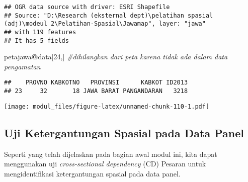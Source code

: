 \documentclass[
]{book}
\newenvironment{Shaded}{\begin{snugshade}}{\end{snugshade}}
\newcommand{\CommentTok}[1]{\textcolor[rgb]{0.56,0.35,0.01}{\textit{#1}}}
\newcommand{\DataTypeTok}[1]{\textcolor[rgb]{0.13,0.29,0.53}{#1}}
\newcommand{\DecValTok}[1]{\textcolor[rgb]{0.00,0.00,0.81}{#1}}
\newcommand{\KeywordTok}[1]{\textcolor[rgb]{0.13,0.29,0.53}{\textbf{#1}}}
\newcommand{\NormalTok}[1]{#1}
\newcommand{\OperatorTok}[1]{\textcolor[rgb]{0.81,0.36,0.00}{\textbf{#1}}}
\newcommand{\StringTok}[1]{\textcolor[rgb]{0.31,0.60,0.02}{#1}}
\begin{document}
\begin{verbatim}
## OGR data source with driver: ESRI Shapefile 
## Source: "D:\Research (eksternal dept)\pelatihan spasial (adj)\modeul 2\Pelatihan-Spasial\Jawamap", layer: "jawa"
## with 119 features
## It has 5 fields
\end{verbatim}

\begin{Shaded}
\begin{Highlighting}[]
\NormalTok{petajawa}\OperatorTok{@}\NormalTok{data[}\DecValTok{24}\NormalTok{,] }\CommentTok{\#dihilangkan dari peta karena tidak ada dalam data pengamatan}
\end{Highlighting}
\end{Shaded}

\begin{verbatim}
##    PROVNO KABKOTNO   PROVINSI      KABKOT ID2013
## 23     32       18 JAWA BARAT PANGANDARAN   3218
\end{verbatim}

\begin{Shaded}
\end{Shaded}

\texttt{[image: modul\_files/figure-latex/unnamed-chunk-110-1.pdf]}

\hypertarget{uji-ketergantungan-spasial-pada-data-panel}{%
\subsection{Uji Ketergantungan Spasial pada Data Panel}\label{uji-ketergantungan-spasial-pada-data-panel}}

Seperti yang telah dijelaskan pada bagian awal modul ini, kita dapat menggunakan uji \emph{cross-sectional dependency} (CD) Pesaran untuk mengidentifikasi ketergantungan spasial pada data panel.
\end{document}
